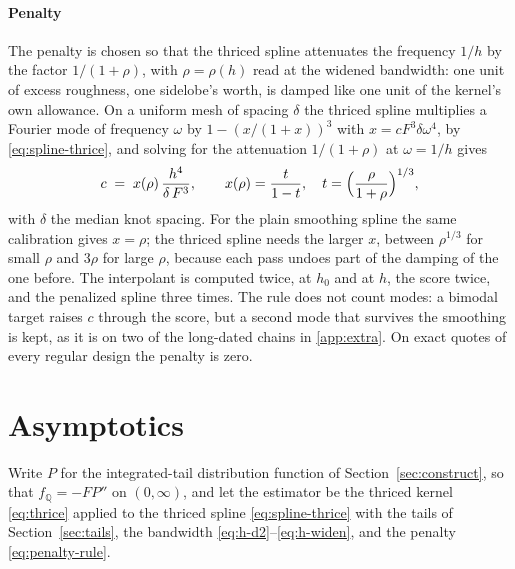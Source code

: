 \documentclass[preprint,12pt,authoryear,times]{elsarticle}
\newcommand{\Q}{\mathbb{Q}}
\begin{document}
\paragraph{Penalty}
The penalty is chosen so that the thriced spline attenuates the frequency \(1/h\) by the factor \(1/(1+\rho)\), with \(\rho=\rho(h)\) read at the widened bandwidth: one unit of excess roughness, one sidelobe's worth, is damped like one unit of the kernel's own allowance. On a uniform mesh of spacing \(\delta\) the thriced spline multiplies a Fourier mode of frequency \(\omega\) by \(1-(x/(1+x))^3\) with \(x=cF^3\delta\omega^4\), by \eqref{eq:spline-thrice}, and solving for the attenuation \(1/(1+\rho)\) at \(\omega=1/h\) gives
\begin{equation}
\label{eq:penalty-rule}
c
\;=\;
x(\rho)\,\frac{h^4}{\delta\,F^3},
\qquad
x(\rho)=\frac{t}{1-t},
\quad
t=\Bigl(\frac{\rho}{1+\rho}\Bigr)^{1/3},
\end{equation}
with \(\delta\) the median knot spacing. For the plain smoothing spline the same calibration gives \(x=\rho\); the thriced spline needs the larger \(x\), between \(\rho^{1/3}\) for small \(\rho\) and \(3\rho\) for large \(\rho\), because each pass undoes part of the damping of the one before. The interpolant is computed twice, at \(h_0\) and at \(h\), the score twice, and the penalized spline three times. The rule does not count modes: a bimodal target raises \(c\) through the score, but a second mode that survives the smoothing is kept, as it is on two of the long-dated chains in \ref{app:extra}. On exact quotes of every regular design the penalty is zero.

\section{Asymptotics}
\label{sec:ifc}

Write \(P\) for the integrated-tail distribution function of Section~\ref{sec:construct}, so that \(f_{\Q}=-FP''\) on \((0,\infty)\), and let the estimator be the thriced kernel \eqref{eq:thrice} applied to the thriced spline \eqref{eq:spline-thrice} with the tails of Section~\ref{sec:tails}, the bandwidth \eqref{eq:h-d2}--\eqref{eq:h-widen}, and the penalty \eqref{eq:penalty-rule}.
\end{document}
